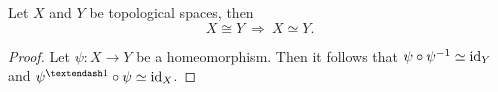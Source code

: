\begin{lemma}
  Let $X$ and $Y$ be topological spaces, then
  \begin{equation*}
    X \cong Y \: \Rightarrow \: X \simeq Y.
  \end{equation*}
\end{lemma}

\begin{proof}
  Let $\psi\colon X \to Y$ be a homeomorphism. Then it follows that $\psi \circ \psi^{-1} \simeq {\rm id}_Y$ and $\psi^{–1} \circ \psi \simeq \id_X$.  
\end{proof}
